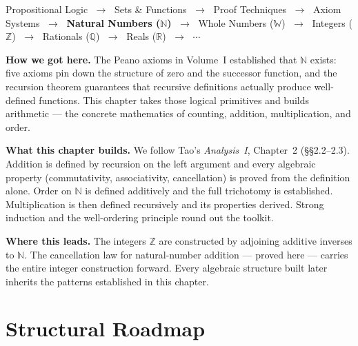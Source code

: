 \begin{tcolorbox}[
  colback=gray!6,
  colframe=gray!40,
  arc=2pt,
  left=8pt, right=8pt, top=6pt, bottom=6pt,
  title={\small\textbf{Where You Are in the Journey}},
  fonttitle=\small\bfseries
]
\begin{center}
\small
Propositional Logic
$\;\to\;$ Sets \& Functions
$\;\to\;$ Proof Techniques
$\;\to\;$ Axiom Systems
$\;\to\;$ \textbf{Natural Numbers ($\mathbb{N}$)}
$\;\to\;$ Whole Numbers ($\mathbb{W}$)
$\;\to\;$ Integers ($\mathbb{Z}$)
$\;\to\;$ Rationals ($\mathbb{Q}$)
$\;\to\;$ Reals ($\mathbb{R}$)
$\;\to\;$ $\cdots$
\end{center}

\medskip
\noindent\textbf{How we got here.}
The Peano axioms in Volume~I established that $\mathbb{N}$ exists:
five axioms pin down the structure of zero and the successor function,
and the recursion theorem guarantees that recursive definitions
actually produce well-defined functions.
This chapter takes those logical primitives and builds arithmetic ---
the concrete mathematics of counting, addition, multiplication, and order.

\medskip
\noindent\textbf{What this chapter builds.}
We follow Tao's \emph{Analysis~I}, Chapter~2 (§§2.2--2.3).
Addition is defined by recursion on the left argument and every
algebraic property (commutativity, associativity, cancellation)
is proved from the definition alone.
Order on $\mathbb{N}$ is defined additively and the full trichotomy
is established. Multiplication is then defined recursively
and its properties derived. Strong induction and the
well-ordering principle round out the toolkit.

\medskip
\noindent\textbf{Where this leads.}
The integers $\mathbb{Z}$ are constructed by adjoining additive inverses
to $\mathbb{N}$.
The cancellation law for natural-number addition --- proved here ---
carries the entire integer construction forward.
Every algebraic structure built later inherits the patterns
established in this chapter.
\end{tcolorbox}
\vspace{1em}

\section*{Structural Roadmap}

